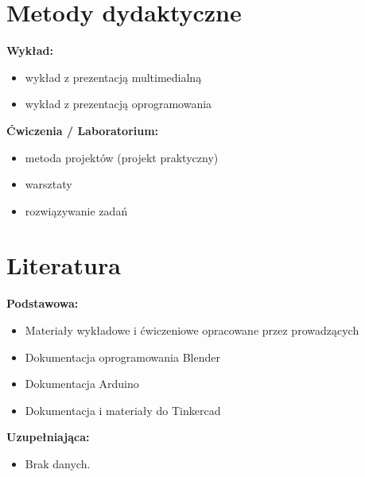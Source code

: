 \documentclass[12pt, a4paper]{article}
\begin{document}
\section{Metody dydaktyczne}

\textbf{Wykład:}
\begin{itemize}
  \item wykład z prezentacją multimedialną
  \item wykład z prezentacją oprogramowania
\end{itemize}
\vspace{4pt}
\textbf{Ćwiczenia / Laboratorium:}
\begin{itemize}
  \item metoda projektów (projekt praktyczny)
  \item warsztaty
  \item rozwiązywanie zadań
\end{itemize}
\vspace{4pt}


\section{Literatura}

\textbf{Podstawowa:}
\begin{itemize}
  \item Materiały wykładowe i ćwiczeniowe opracowane przez prowadzących
  \item Dokumentacja oprogramowania Blender
  \item Dokumentacja Arduino
  \item Dokumentacja i materiały do Tinkercad
\end{itemize}

\textbf{Uzupełniająca:}
\begin{itemize}
  \item Brak danych.
\end{itemize}
\end{document}
